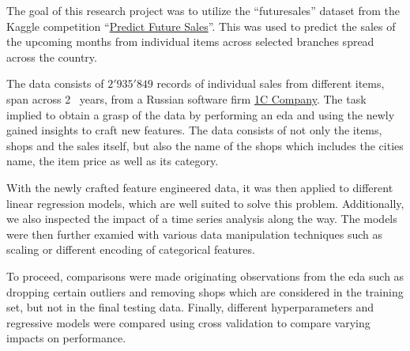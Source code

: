 The goal of this research project was to utilize the \enquote{\gls{futuresales}} dataset from the Kaggle competition \enquote{\href{https://www.kaggle.com/c/competitive-data-science-predict-future-sales}{Predict Future Sales}}.
This was used to predict the sales of the upcoming months from individual items across selected branches spread across the country.

The data consists of $2'935'849$ records of individual sales from different items, span across 2 \textonehalf \ years, from a Russian software firm \href{https://1c.ru/eng/title.htm}{1C Company}.
The task implied to obtain a grasp of the data by performing an \acrfull{eda} and using the newly gained insights to craft new features.
The data consists of not only the items, shops and the sales itself, but also the name of the shops which includes the cities name, the item price as well as its category.

With the newly crafted feature engineered data, it was then applied to different linear regression models, which are well suited to solve this problem.
Additionally, we also inspected the impact of a time series analysis along the way.
The models were then further examied with various data manipulation techniques such as scaling or different encoding of categorical features.

To proceed, comparisons were made originating observations from the \acrshort{eda} such as dropping certain outliers and removing shops which are considered in the training set, but not in the final testing data.
Finally, different \glspl{hyperparameter} and regressive models were compared using cross validation to compare varying impacts on performance.
